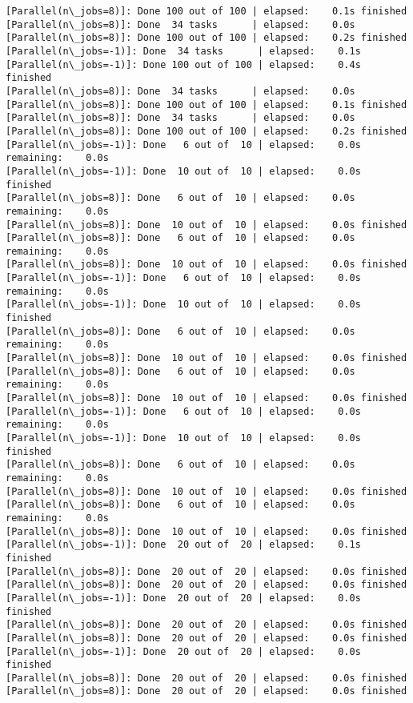\documentclass[11pt]{article}
\begin{document}
\begin{Verbatim}[commandchars=\\\{\}]
[Parallel(n\_jobs=8)]: Done 100 out of 100 | elapsed:    0.1s finished
[Parallel(n\_jobs=8)]: Done  34 tasks      | elapsed:    0.0s
[Parallel(n\_jobs=8)]: Done 100 out of 100 | elapsed:    0.2s finished
[Parallel(n\_jobs=-1)]: Done  34 tasks      | elapsed:    0.1s
[Parallel(n\_jobs=-1)]: Done 100 out of 100 | elapsed:    0.4s finished
[Parallel(n\_jobs=8)]: Done  34 tasks      | elapsed:    0.0s
[Parallel(n\_jobs=8)]: Done 100 out of 100 | elapsed:    0.1s finished
[Parallel(n\_jobs=8)]: Done  34 tasks      | elapsed:    0.0s
[Parallel(n\_jobs=8)]: Done 100 out of 100 | elapsed:    0.2s finished
[Parallel(n\_jobs=-1)]: Done   6 out of  10 | elapsed:    0.0s remaining:    0.0s
[Parallel(n\_jobs=-1)]: Done  10 out of  10 | elapsed:    0.0s finished
[Parallel(n\_jobs=8)]: Done   6 out of  10 | elapsed:    0.0s remaining:    0.0s
[Parallel(n\_jobs=8)]: Done  10 out of  10 | elapsed:    0.0s finished
[Parallel(n\_jobs=8)]: Done   6 out of  10 | elapsed:    0.0s remaining:    0.0s
[Parallel(n\_jobs=8)]: Done  10 out of  10 | elapsed:    0.0s finished
[Parallel(n\_jobs=-1)]: Done   6 out of  10 | elapsed:    0.0s remaining:    0.0s
[Parallel(n\_jobs=-1)]: Done  10 out of  10 | elapsed:    0.0s finished
[Parallel(n\_jobs=8)]: Done   6 out of  10 | elapsed:    0.0s remaining:    0.0s
[Parallel(n\_jobs=8)]: Done  10 out of  10 | elapsed:    0.0s finished
[Parallel(n\_jobs=8)]: Done   6 out of  10 | elapsed:    0.0s remaining:    0.0s
[Parallel(n\_jobs=8)]: Done  10 out of  10 | elapsed:    0.0s finished
[Parallel(n\_jobs=-1)]: Done   6 out of  10 | elapsed:    0.0s remaining:    0.0s
[Parallel(n\_jobs=-1)]: Done  10 out of  10 | elapsed:    0.0s finished
[Parallel(n\_jobs=8)]: Done   6 out of  10 | elapsed:    0.0s remaining:    0.0s
[Parallel(n\_jobs=8)]: Done  10 out of  10 | elapsed:    0.0s finished
[Parallel(n\_jobs=8)]: Done   6 out of  10 | elapsed:    0.0s remaining:    0.0s
[Parallel(n\_jobs=8)]: Done  10 out of  10 | elapsed:    0.0s finished
[Parallel(n\_jobs=-1)]: Done  20 out of  20 | elapsed:    0.1s finished
[Parallel(n\_jobs=8)]: Done  20 out of  20 | elapsed:    0.0s finished
[Parallel(n\_jobs=8)]: Done  20 out of  20 | elapsed:    0.0s finished
[Parallel(n\_jobs=-1)]: Done  20 out of  20 | elapsed:    0.0s finished
[Parallel(n\_jobs=8)]: Done  20 out of  20 | elapsed:    0.0s finished
[Parallel(n\_jobs=8)]: Done  20 out of  20 | elapsed:    0.0s finished
[Parallel(n\_jobs=-1)]: Done  20 out of  20 | elapsed:    0.0s finished
[Parallel(n\_jobs=8)]: Done  20 out of  20 | elapsed:    0.0s finished
[Parallel(n\_jobs=8)]: Done  20 out of  20 | elapsed:    0.0s finished

\end{Verbatim}
\end{document}
